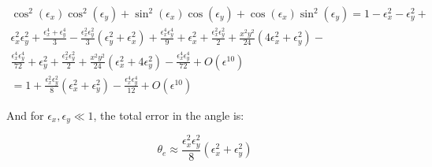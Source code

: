 \documentclass[../PaulGanssle-Thesis.tex]{subfiles}
\begin{document}
\begin{equation*}
\begin{split}
 \cos^2(\epsilon_{x})\cos^2(\epsilon_{y}) + \sin^2(\epsilon_{x})\cos(\epsilon_{y}) + \cos(\epsilon_{x})\sin^2(\epsilon_{y})  =  1 - \epsilon_{x}^2 - \epsilon_{y}^2 + \\
 \epsilon_{x}^2\epsilon_{y}^2 +  \frac{\epsilon_{x}^4 + \epsilon_{y}^4}{3} -\frac{\epsilon_{x}^2\epsilon_{y}^2}{3}\left(\epsilon_{y}^2 + \epsilon_{x}^2\right) + \frac{\epsilon_{x}^4\epsilon_{y}^4}{9} + \epsilon_{x}^2 + \frac{\epsilon_{x}^2\epsilon_{y}^2}{2} + \frac{x^2y^2}{24}\left(4\epsilon_{x}^2 + \epsilon_{y}^2\right) - \\
 \frac{\epsilon_{x}^4\epsilon_{y}^4}{72} + \epsilon_{y}^2 + \frac{\epsilon_{x}^2\epsilon_{y}^2}{2} + \frac{x^2y^2}{24}\left(\epsilon_{x}^2 + 4\epsilon_{y}^2\right) - \frac{\epsilon_{x}^4\epsilon_{y}^4}{72} + O(\epsilon^{10})\\
 = 1 + \frac{\epsilon_{x}^2\epsilon_{y}^2}{8}\left(\epsilon_{x}^2+\epsilon_{y}^2\right) - \frac{\epsilon_{x}^4\epsilon_{y}^4}{12}+O\left(\epsilon^{10}\right)
\end{split}
\end{equation*}


And for $\epsilon_{x},\epsilon_{y} \ll 1$, the total error in the angle is:

\begin{equation}
\theta_{e} \approx \frac{\epsilon_{x}^2\epsilon_{y}^2}{8}\left(\epsilon_{x}^2+\epsilon_{y}^2\right)
\end{equation}
\end{document}
